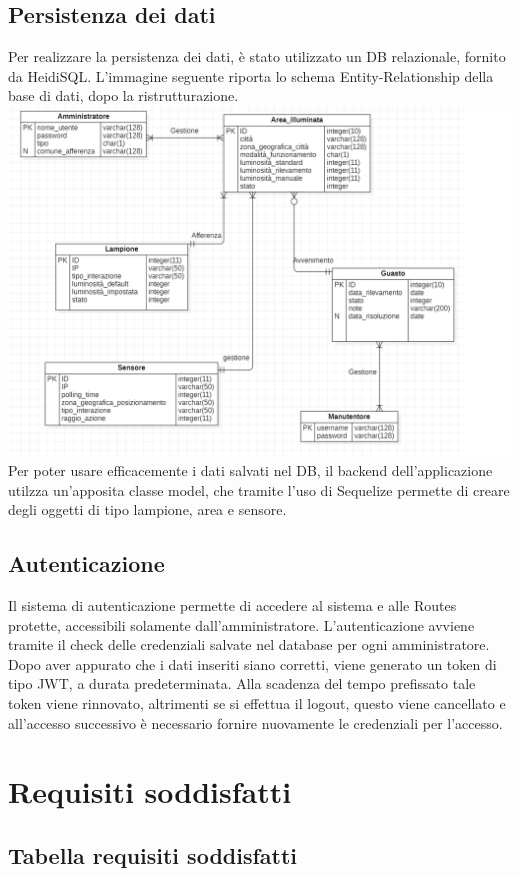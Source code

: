 \documentclass[12pt]{article}
\begin{document}
\subsection{Persistenza dei dati}
Per realizzare la persistenza dei dati, è stato utilizzato un DB relazionale, fornito da HeidiSQL.
L'immagine seguente riporta lo schema Entity-Relationship della base di dati, dopo la ristrutturazione.
\clearpage
\includegraphics[width=450pt]{er ristrutturato.png}
Per poter usare efficacemente i dati salvati nel DB, il backend dell'applicazione utilzza un'apposita classe model, che tramite l'uso di Sequelize permette di creare degli oggetti di tipo lampione, area e sensore.
\subsection{Autenticazione}
Il sistema di autenticazione permette di accedere al sistema e alle Routes protette, accessibili solamente dall'amministratore.
L'autenticazione avviene tramite il check delle credenziali salvate nel database per ogni amministratore.
Dopo aver appurato che i dati inseriti siano corretti, viene generato un token di tipo JWT, a durata predeterminata. Alla scadenza del tempo prefissato tale token viene rinnovato, altrimenti se si effettua il logout, questo viene cancellato e all'accesso successivo è necessario fornire nuovamente le credenziali per l'accesso.

 	
\section{Requisiti soddisfatti}
\subsection{Tabella requisiti soddisfatti}
\end{document}
